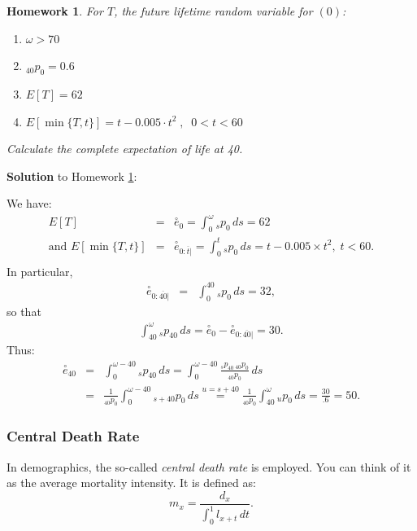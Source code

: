 \documentclass[11pt,fleqn,oneside]{book}
\newtheorem{homework}{Homework}
\begin{document}
\begin{homework}
\label{HW6}
 For $T$, the future lifetime random variable for $(0)$:
\begin{enumerate}
\item $\omega > 70$
\item ${_{40}p_0} = 0.6$
\item $E[T] = 62$
\item $E[\min\{T,t\}] = t - 0.005\cdot t^2\;,\;\;0<t<60$
\end{enumerate}
Calculate the complete expectation of life at 40.
\end{homework}

\noindent \textbf{Solution} to Homework \ref{HW6}:
\footnotesize

We have:
\begin{eqnarray*}
E[T] &=& \stackrel{\circ}{e}_0  = \int_0^{\omega} {_sp_0}\,ds = 62\\
\text{and }E[\min\{T,t\}] &=& \stackrel{\circ}{e}_{0:\overline{t}|}  = \int_0^{t} {_sp_0}\,ds = t - 0.005 \times t^2,\;t<60.\\
\end{eqnarray*}
In particular,
\begin{eqnarray*}
\stackrel{\circ}{e}_{0:\overline{40}|}  &=& \int_0^{40} {_sp_0}\,ds = 32,
\end{eqnarray*}
so that
\begin{eqnarray*}
\int_{40}^{\omega} {_sp_{40}}\,ds = \stackrel{\circ}{e}_0  -\stackrel{\circ}{e}_{0:\overline{40}|}  = 30.
\end{eqnarray*}
Thus:
\begin{eqnarray*}
\stackrel{\circ}{e}_{40} &=& \int_0^{\omega - 40}  {_sp_{40}}\,ds = \int_0^{\omega - 40} \frac{ {_sp_{40}} \,  {_{40}p_{0}}}{ {_{40}p_{0}}}\,ds \\
&=& \frac{1}{ {_{40}p_{0}}} \int_0^{\omega -40} {_{s+40}p_0}\,ds \stackrel{u=s+40}{=}  \frac{1}{ {_{40}p_{0}}} \int_{40}^{\omega} {_{u}p_0}\,ds = \frac{30}{.6} =50.
\end{eqnarray*}
\normalsize

\subsubsection*{Central Death Rate}

In demographics, the so-called \textit{central death rate}  is employed. You can think of it as the average mortality intensity. It is defined as:
$$
m_x = \frac{d_x}{\int_0^1 l_{x+t}\,dt}.
$$
\end{document}
